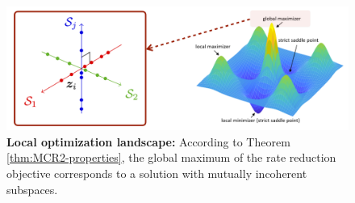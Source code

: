 \documentclass[../../book-main.tex]{subfiles}
\begin{document}




\begin{figure}[t]
	\centering
	\includegraphics[width=0.8\linewidth]{chapters/chapter3/figs/mcr2-global.png}
	\caption{{\bf Local optimization landscape:} According to Theorem \ref{thm:MCR2-properties}, the global maximum of the rate reduction objective corresponds to a solution with mutually incoherent subspaces.}
	\label{fig:mcr-global}
\end{figure}
\end{document}
